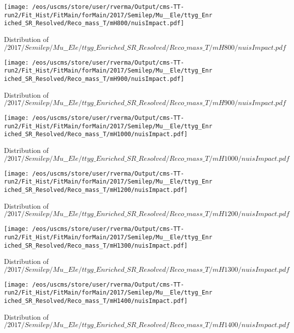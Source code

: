 \begin{figure}
\centering
\texttt{[image: /eos/uscms/store/user/rverma/Output/cms-TT-run2/Fit\_Hist/FitMain/forMain/2017/Semilep/Mu\_\_Ele/ttyg\_Enriched\_SR\_Resolved/Reco\_mass\_T/mH800/nuisImpact.pdf]}
\caption{Distribution of $/2017/Semilep/Mu\_\_Ele/ttyg\_Enriched\_SR\_Resolved/Reco\_mass\_T/mH800/nuisImpact.pdf$}
\end{figure}

\begin{figure}
\centering
\texttt{[image: /eos/uscms/store/user/rverma/Output/cms-TT-run2/Fit\_Hist/FitMain/forMain/2017/Semilep/Mu\_\_Ele/ttyg\_Enriched\_SR\_Resolved/Reco\_mass\_T/mH900/nuisImpact.pdf]}
\caption{Distribution of $/2017/Semilep/Mu\_\_Ele/ttyg\_Enriched\_SR\_Resolved/Reco\_mass\_T/mH900/nuisImpact.pdf$}
\end{figure}

\begin{figure}
\centering
\texttt{[image: /eos/uscms/store/user/rverma/Output/cms-TT-run2/Fit\_Hist/FitMain/forMain/2017/Semilep/Mu\_\_Ele/ttyg\_Enriched\_SR\_Resolved/Reco\_mass\_T/mH1000/nuisImpact.pdf]}
\caption{Distribution of $/2017/Semilep/Mu\_\_Ele/ttyg\_Enriched\_SR\_Resolved/Reco\_mass\_T/mH1000/nuisImpact.pdf$}
\end{figure}

\begin{figure}
\centering
\texttt{[image: /eos/uscms/store/user/rverma/Output/cms-TT-run2/Fit\_Hist/FitMain/forMain/2017/Semilep/Mu\_\_Ele/ttyg\_Enriched\_SR\_Resolved/Reco\_mass\_T/mH1200/nuisImpact.pdf]}
\caption{Distribution of $/2017/Semilep/Mu\_\_Ele/ttyg\_Enriched\_SR\_Resolved/Reco\_mass\_T/mH1200/nuisImpact.pdf$}
\end{figure}

\begin{figure}
\centering
\texttt{[image: /eos/uscms/store/user/rverma/Output/cms-TT-run2/Fit\_Hist/FitMain/forMain/2017/Semilep/Mu\_\_Ele/ttyg\_Enriched\_SR\_Resolved/Reco\_mass\_T/mH1300/nuisImpact.pdf]}
\caption{Distribution of $/2017/Semilep/Mu\_\_Ele/ttyg\_Enriched\_SR\_Resolved/Reco\_mass\_T/mH1300/nuisImpact.pdf$}
\end{figure}

\begin{figure}
\centering
\texttt{[image: /eos/uscms/store/user/rverma/Output/cms-TT-run2/Fit\_Hist/FitMain/forMain/2017/Semilep/Mu\_\_Ele/ttyg\_Enriched\_SR\_Resolved/Reco\_mass\_T/mH1400/nuisImpact.pdf]}
\caption{Distribution of $/2017/Semilep/Mu\_\_Ele/ttyg\_Enriched\_SR\_Resolved/Reco\_mass\_T/mH1400/nuisImpact.pdf$}
\end{figure}

